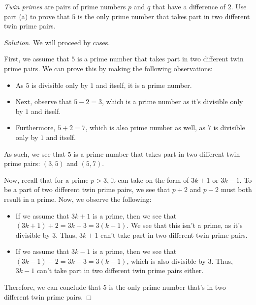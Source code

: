 \documentclass{article}
\newenvironment{solution}{\begin{proof}[Solution]}{\end{proof}}
\begin{document}
\begin{hw}
	\textit{Twin primes} are pairs of prime numbers $p$ and $q$ that have a difference of $2$. Use part (a) to prove that $5$ is the only prime number that takes part in two different twin prime pairs.
\end{hw}
\begin{solution}
	We will proceed by cases.
	
	
	
	First, we assume that $5$ is a prime number that takes part in two different twin prime pairs. We can prove this by making the following observations:
	\begin{itemize}
		\item As $5$ is divisible only by $1$ and itself, it is a prime number. 
		\item Next, observe that $5-2 = 3$, which is a prime number as it's divisible only by $1$ and itself.
		\item Furthermore, $5+2=7$, which is also prime number as well, as $7$ is divisible only by $1$ and itself.
	\end{itemize}
	As such, we see that $5$ is a prime number that takes part in two different twin prime pairs: $(3,5)$ and $(5,7)$.

	Now, recall that for a prime $p>3$, it can take on the form of $3k+1$ or $3k-1$. To be a part of two different twin prime pairs, we see that $p+2$ and $p-2$ must both result in a prime. Now, we observe the following:
	\begin{itemize}
		\item If we assume that $3k+1$ is a prime, then we see that $\left( 3k+1 \right)+2 = 3k+3 = 3(k+1)$. We see that this isn't a prime, as it's divisible by $3$. Thus, $3k+1$ can't take part in two different twin prime pairs.
		
		\item If we assume that $3k-1$ is a prime, then we see that $(3k-1)-2 = 3k-3 = 3(k-1)$, which is also divisible by $3$. Thus, $3k-1$ can't take part in two different twin prime pairs either.
	\end{itemize}

	Therefore, we can conclude that $5$ is the only prime number that's in two different twin prime pairs.
\end{solution}

\newpage
\end{document}
